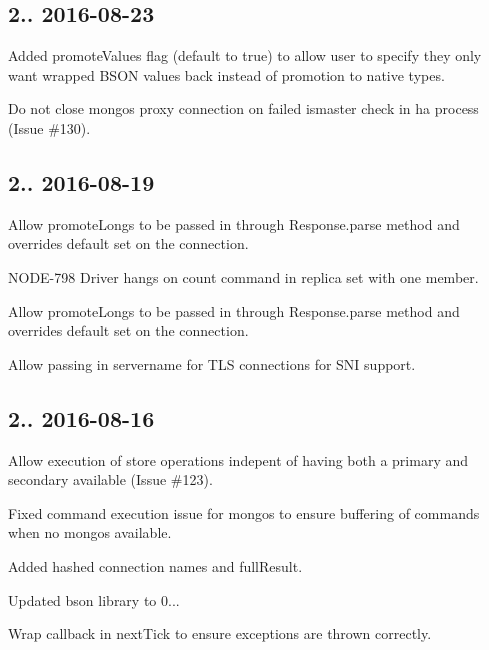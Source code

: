 \subsection*{2.. 2016-\/08-\/23 }


\begin{DoxyItemize}
\item Added promote\+Values flag (default to true) to allow user to specify they only want wrapped B\+S\+ON values back instead of promotion to native types.
\item Do not close mongos proxy connection on failed ismaster check in ha process (Issue \#130).
\end{DoxyItemize}

\subsection*{2.. 2016-\/08-\/19 }


\begin{DoxyItemize}
\item Allow promote\+Longs to be passed in through Response.\+parse method and overrides default set on the connection.
\item N\+O\+D\+E-\/798 Driver hangs on count command in replica set with one member.
\item Allow promote\+Longs to be passed in through Response.\+parse method and overrides default set on the connection.
\item Allow passing in servername for T\+LS connections for S\+NI support.
\end{DoxyItemize}

\subsection*{2.. 2016-\/08-\/16 }


\begin{DoxyItemize}
\item Allow execution of store operations indepent of having both a primary and secondary available (Issue \#123).
\item Fixed command execution issue for mongos to ensure buffering of commands when no mongos available.
\item Added hashed connection names and full\+Result.
\item Updated bson library to 0...
\item Wrap callback in next\+Tick to ensure exceptions are thrown correctly.
\end{DoxyItemize}

